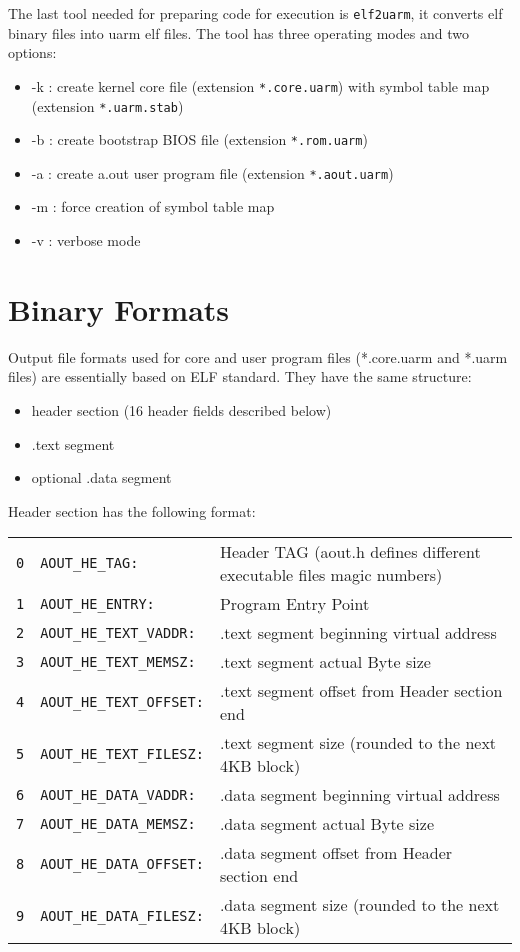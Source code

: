 The last tool needed for preparing code for execution is \texttt{elf2uarm}, it converts elf binary files into uarm elf files. The tool has three operating modes and two options:

\begin{itemize}
\item -k : create kernel core file (extension \texttt{*.core.uarm}) with symbol table map (extension \texttt{*.uarm.stab})
\item -b : create bootstrap BIOS file (extension \texttt{*.rom.uarm})
\item -a : create a.out user program file (extension \texttt{*.aout.uarm})
\\
\item -m : force creation of symbol table map
\item -v : verbose mode
\end{itemize}

\section{Binary Formats}

Output file formats used for core and user program files (*.core.uarm and *.uarm files) are essentially based on ELF standard. They have the same structure:
\begin{itemize}
\item header section (16 header fields described below)
\item .text segment
\item optional .data segment
\end{itemize}

Header section has the following format:
\\

\begin{tabular}{rll}
\texttt{0} & \texttt{AOUT\_HE\_TAG:} & Header TAG (aout.h defines different executable files magic numbers) \\
\texttt{1} & \texttt{AOUT\_HE\_ENTRY:} & Program Entry Point \\
\texttt{2} & \texttt{AOUT\_HE\_TEXT\_VADDR:} & .text segment beginning virtual address \\
\texttt{3} & \texttt{AOUT\_HE\_TEXT\_MEMSZ:} & .text segment actual Byte size \\
\texttt{4} & \texttt{AOUT\_HE\_TEXT\_OFFSET:} & .text segment offset from Header section end \\
\texttt{5} & \texttt{AOUT\_HE\_TEXT\_FILESZ:} & .text segment size (rounded to the next 4KB block) \\
\texttt{6} & \texttt{AOUT\_HE\_DATA\_VADDR:} & .data segment beginning virtual address \\
\texttt{7} & \texttt{AOUT\_HE\_DATA\_MEMSZ:} & .data segment actual Byte size \\
\texttt{8} & \texttt{AOUT\_HE\_DATA\_OFFSET:} & .data segment offset from Header section end \\
\texttt{9} & \texttt{AOUT\_HE\_DATA\_FILESZ:} & .data segment size (rounded to the next 4KB block) \\
\end{tabular}
\\

